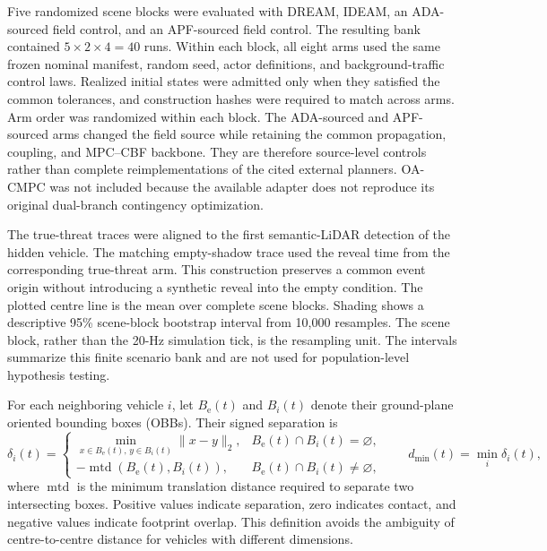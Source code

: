 Five randomized scene blocks were evaluated with DREAM, IDEAM, an ADA-sourced
field control, and an APF-sourced field control.  The resulting bank contained
$5\times2\times4=40$ runs.  Within each block, all eight arms used the same
frozen nominal manifest, random seed, actor definitions, and background-traffic
control laws.  Realized
initial states were admitted only when they satisfied the common tolerances,
and construction hashes were required to match across arms.  Arm order was
randomized within each block.  The ADA-sourced and APF-sourced arms changed
the field source while retaining the common propagation, coupling, and
MPC--CBF backbone.  They are
therefore source-level controls rather than complete reimplementations of the
cited external planners.  OA-CMPC was not included because the available
adapter does not reproduce its original dual-branch contingency optimization.

The true-threat traces were aligned to the first semantic-LiDAR detection of
the hidden vehicle.  The matching empty-shadow trace used the reveal time from
the corresponding true-threat arm.  This construction preserves a common
event origin without introducing a synthetic reveal into the empty condition.
The plotted centre line is the mean over complete scene blocks.  Shading shows
a descriptive 95\% scene-block bootstrap interval from 10,000 resamples.  The
scene block, rather than the 20-Hz simulation tick, is the resampling unit.
The intervals summarize this finite scenario bank and are not used for
population-level hypothesis testing.

For each neighboring vehicle $i$, let $B_{\mathrm{e}}(t)$ and $B_i(t)$ denote
their ground-plane oriented bounding boxes (OBBs).  Their signed separation is
\begin{equation}
\delta_i(t)=
\begin{cases}
\displaystyle \min_{x\in B_{\mathrm{e}}(t),\,y\in B_i(t)}\lVert x-y\rVert_2,
& B_{\mathrm{e}}(t)\cap B_i(t)=\varnothing,\\[2mm]
-\operatorname{mtd}\!\left(B_{\mathrm{e}}(t),B_i(t)\right),
& B_{\mathrm{e}}(t)\cap B_i(t)\neq\varnothing,
\end{cases}
\qquad
d_{\min}(t)=\min_i\delta_i(t),
\label{eq:signed-obb-clearance}
\end{equation}
where $\operatorname{mtd}$ is the minimum translation distance required to
separate two intersecting boxes.  Positive values indicate separation, zero
indicates contact, and negative values indicate footprint overlap.  This
definition avoids the ambiguity of centre-to-centre distance for vehicles
with different dimensions.

